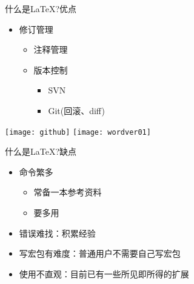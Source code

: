\documentclass[xcolor=svgnames, t, aspectratio=169]{ctexbeamer}
\begin{document}
\begin{frame}[t]{什么是\LaTeX?}{优点}
  \begin{itemize}
  \item 修订管理
    \begin{itemize}
    \item 注释管理
    \item 版本控制
      \begin{itemize}
      \item SVN
      \item Git(回滚、diff)
      \end{itemize}
    \end{itemize}
  \end{itemize}
  \begin{center}
    \texttt{[image: github]}\quad
    \texttt{[image: wordver01]}\quad
  \end{center}
\end{frame}

\begin{frame}[t]{什么是\LaTeX?}{缺点}
  \stretchon
  \begin{itemize}
  \item 命令繁多
    \begin{itemize}
    \item 常备一本参考资料
    \item 要\alert{多用}
    \end{itemize}
  \item 错误难找：积累经验
  \item 写宏包有难度：普通用户不需要自己写宏包
  \item 使用不直观：目前已有一些所见即所得的扩展
  \end{itemize}
  \stretchoff
\end{frame}
\end{document}
